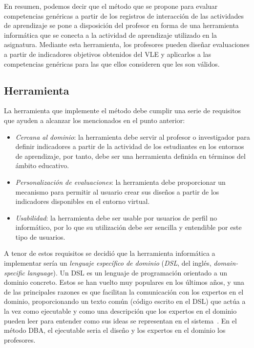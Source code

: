 En resumen, podemos decir que el método que se propone para evaluar competencias genéricas a partir de los registros de interacción de las actividades de aprendizaje se pone a disposición del profesor en forma de una herramienta informática que se conecta a la actividad de aprendizaje utilizado en la asignatura. Mediante esta herramienta, los profesores pueden diseñar evaluaciones a partir de indicadores objetivos obtenidos del VLE y aplicarlos a las competencias genéricas para las que ellos consideren que les son válidos.

\subsection{Herramienta}

La herramienta que implemente el método debe cumplir una serie de requisitos que ayuden a alcanzar los mencionados en el punto anterior:

\begin{itemize}
\item \emph{Cercana al dominio}: la herramienta debe servir al profesor o investigador para definir indicadores a partir de la actividad de los estudiantes en los entornos de aprendizaje, por tanto, debe ser una herramienta definida en términos del ámbito educativo.
\item \emph{Personalización de evaluaciones}: la herramienta debe proporcionar un mecanismo para permitir al usuario crear sus diseños a partir de los indicadores disponibles en el entorno virtual.
\item \emph{Usabilidad}: la herramienta debe ser usable por usuarios de perfil no informático, por lo que su utilización debe ser sencilla y entendible por este tipo de usuarios.
\end{itemize}

A tenor de estos requisitos se decidió que la herramienta informática a implementar sería un \emph{lenguaje específico de dominio} (\emph{DSL}, del inglés, \emph{domain-specific language}). Un DSL es un lenguaje de programación orientado a un dominio concreto. Estos se han vuelto muy populares en los últimos años, y una de las principales razones es que facilitan la comunicación con los expertos en el dominio, proporcionando un texto común (código escrito en el DSL) que actúa a la vez como ejecutable y como una descripción que los expertos en el dominio pueden leer para entender como sus ideas se representan en el sistema~\cite{fowler2010domain}. En el método DBA, el ejecutable seria el diseño y los expertos en el dominio los profesores.



